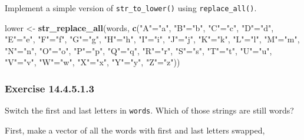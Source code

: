 \documentclass[]{book}
\newenvironment{Shaded}{\begin{snugshade}}{\end{snugshade}}
\newcommand{\KeywordTok}[1]{\textcolor[rgb]{0.13,0.29,0.53}{\textbf{#1}}}
\newcommand{\NormalTok}[1]{#1}
\newcommand{\StringTok}[1]{\textcolor[rgb]{0.31,0.60,0.02}{#1}}
\theoremstyle{plain}
\theoremstyle{remark}
\begin{document}
Implement a simple version of \texttt{str\_to\_lower()} using \texttt{replace\_all()}.

\begin{Shaded}
\begin{Highlighting}[]
\NormalTok{lower <-}\StringTok{ }\KeywordTok{str_replace_all}\NormalTok{(words, }\KeywordTok{c}\NormalTok{(}\StringTok{"A"}\NormalTok{=}\StringTok{"a"}\NormalTok{, }\StringTok{"B"}\NormalTok{=}\StringTok{"b"}\NormalTok{, }\StringTok{"C"}\NormalTok{=}\StringTok{"c"}\NormalTok{, }\StringTok{"D"}\NormalTok{=}\StringTok{"d"}\NormalTok{, }\StringTok{"E"}\NormalTok{=}\StringTok{"e"}\NormalTok{, }\StringTok{"F"}\NormalTok{=}\StringTok{"f"}\NormalTok{, }\StringTok{"G"}\NormalTok{=}\StringTok{"g"}\NormalTok{, }\StringTok{"H"}\NormalTok{=}\StringTok{"h"}\NormalTok{, }\StringTok{"I"}\NormalTok{=}\StringTok{"i"}\NormalTok{, }\StringTok{"J"}\NormalTok{=}\StringTok{"j"}\NormalTok{, }\StringTok{"K"}\NormalTok{=}\StringTok{"k"}\NormalTok{, }\StringTok{"L"}\NormalTok{=}\StringTok{"l"}\NormalTok{, }\StringTok{"M"}\NormalTok{=}\StringTok{"m"}\NormalTok{, }\StringTok{"N"}\NormalTok{=}\StringTok{"n"}\NormalTok{, }\StringTok{"O"}\NormalTok{=}\StringTok{"o"}\NormalTok{, }\StringTok{"P"}\NormalTok{=}\StringTok{"p"}\NormalTok{, }\StringTok{"Q"}\NormalTok{=}\StringTok{"q"}\NormalTok{, }\StringTok{"R"}\NormalTok{=}\StringTok{"r"}\NormalTok{, }\StringTok{"S"}\NormalTok{=}\StringTok{"s"}\NormalTok{, }\StringTok{"T"}\NormalTok{=}\StringTok{"t"}\NormalTok{, }\StringTok{"U"}\NormalTok{=}\StringTok{"u"}\NormalTok{, }\StringTok{"V"}\NormalTok{=}\StringTok{"v"}\NormalTok{, }\StringTok{"W"}\NormalTok{=}\StringTok{"w"}\NormalTok{, }\StringTok{"X"}\NormalTok{=}\StringTok{"x"}\NormalTok{, }\StringTok{"Y"}\NormalTok{=}\StringTok{"y"}\NormalTok{, }\StringTok{"Z"}\NormalTok{=}\StringTok{"z"}\NormalTok{))}
\end{Highlighting}
\end{Shaded}

\hypertarget{exercise-14.4.5.1.3}{%
\subsubsection*{\texorpdfstring{Exercise {14.4.5.1.3}}{Exercise 14.4.5.1.3}}\label{exercise-14.4.5.1.3}}

Switch the first and last letters in \texttt{words}. Which of those strings are still words?

First, make a vector of all the words with first and last letters swapped,
\end{document}
